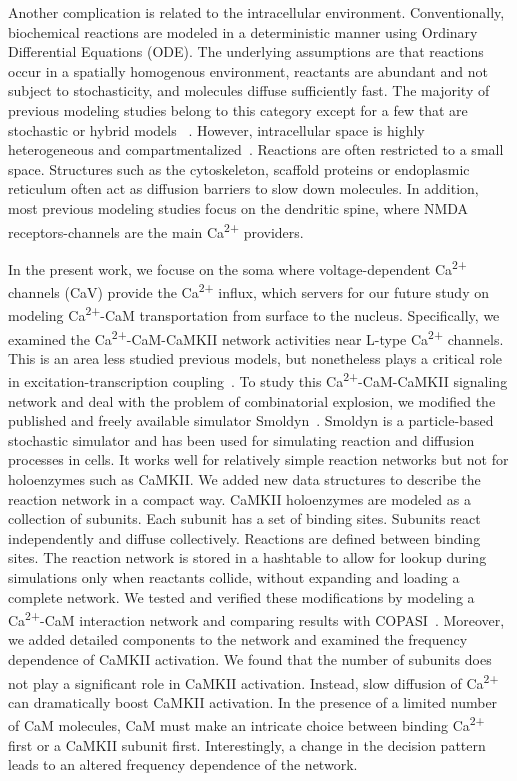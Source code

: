 \documentclass[10pt,letterpaper]{article}
\begin{document}
Another complication is related to the intracellular environment. Conventionally, biochemical reactions are modeled in a deterministic manner using Ordinary Differential Equations (ODE). The underlying assumptions are that reactions occur in a spatially homogenous environment, reactants are abundant and not subject to stochasticity, and molecules diffuse sufficiently fast. The majority of previous modeling studies belong to this category except for a few that are stochastic or hybrid models ~\cite{Bhalla:2004cu, Zeng:2010bq, Holmes:2000uk}. However, intracellular space is highly heterogeneous and compartmentalized~\cite{LubyPhelps:2000uj,Dix:2008gy}. Reactions are often restricted to a small space. Structures such as the cytoskeleton, scaffold proteins or endoplasmic reticulum often act as diffusion barriers to slow down molecules. In addition, most previous modeling studies focus on the dendritic spine, where NMDA receptors-channels are the main Ca\textsuperscript{2+} providers. 

In the present work, we focuse on the soma where voltage-dependent Ca\textsuperscript{2+} channels (CaV) provide the Ca\textsuperscript{2+} influx, which servers for our future study on modeling Ca\textsuperscript{2+}-CaM transportation from surface to the nucleus. Specifically, we examined the Ca\textsuperscript{2+}-CaM-CaMKII network activities near L-type Ca\textsuperscript{2+} channels. This is an area less studied previous models, but nonetheless plays a critical role in excitation-transcription coupling~\cite{Ma:2015bg,Li:2016cq}. To study this Ca\textsuperscript{2+}-CaM-CaMKII signaling network and deal with the problem of combinatorial explosion, we modified the published and freely available simulator Smoldyn~\cite{Andrews:2004fs}. Smoldyn is a particle-based stochastic simulator and has been used for simulating reaction and diffusion processes in cells. It works well for relatively simple reaction networks but not for holoenzymes such as CaMKII. We added new data structures to describe the reaction network in a compact way. CaMKII holoenzymes are modeled as a collection of subunits. Each subunit has a set of binding sites. Subunits react independently and diffuse collectively. Reactions are defined between binding sites. The reaction network is stored in a hashtable to allow for lookup during simulations only when reactants collide, without expanding and loading a complete network. We tested and verified these modifications by modeling a Ca\textsuperscript{2+}-CaM interaction network and comparing results with COPASI~\cite{Hoops:2006gy}. Moreover, we added detailed components to the network and examined the frequency dependence of CaMKII activation. We found that the number of subunits does not play a significant role in CaMKII activation. Instead, slow diffusion of Ca\textsuperscript{2+} can dramatically boost CaMKII activation. In the presence of a limited number of CaM molecules, CaM must make an intricate choice between binding Ca\textsuperscript{2+} first or a CaMKII subunit first. Interestingly, a change in the decision pattern leads to an altered frequency dependence of the network. 
\end{document}
